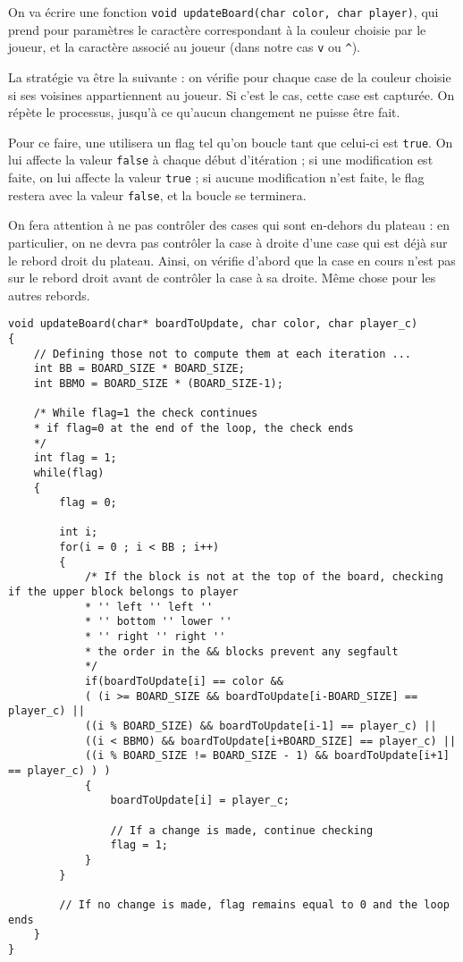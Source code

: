 \documentclass[a4paper,11pt]{article}
\begin{document}
	On va écrire une fonction \texttt{void updateBoard(char color, char player)}, qui prend pour paramètres le caractère correspondant à la couleur choisie par le joueur, et la caractère associé au joueur (dans notre cas \texttt{v} ou \texttt{\^}).
	
	La stratégie va être la suivante : on vérifie pour chaque case de la couleur choisie si ses voisines appartiennent au joueur. Si c'est le cas, cette case est capturée. On répète le processus, jusqu'à ce qu'aucun changement ne puisse être fait.
	
	Pour ce faire, une utilisera un flag tel qu'on boucle tant que celui-ci est \texttt{true}. On lui affecte la valeur \texttt{false} à chaque début d'itération ; si une modification est faite, on lui affecte la valeur \texttt{true} ; si aucune modification n'est faite, le flag restera avec la valeur \texttt{false}, et la boucle se terminera.
	
	On fera attention \`a ne pas contr\^oler des cases qui sont en-dehors du plateau : en particulier, on ne devra pas contr\^oler la case \`a droite d'une case qui est d\'ej\`a sur le rebord droit du plateau. Ainsi, on v\'erifie d'abord que la case en cours n'est pas sur le rebord droit avant de contr\^oler la case \`a sa droite. M\^eme chose pour les autres rebords.
	
	\begin{lstlisting}
void updateBoard(char* boardToUpdate, char color, char player_c)
{
	// Defining those not to compute them at each iteration ...
	int BB = BOARD_SIZE * BOARD_SIZE;
	int BBMO = BOARD_SIZE * (BOARD_SIZE-1);
	
	/* While flag=1 the check continues
	* if flag=0 at the end of the loop, the check ends
	*/
	int flag = 1;
	while(flag)
	{
		flag = 0;
		
		int i;
		for(i = 0 ; i < BB ; i++)
		{
			/* If the block is not at the top of the board, checking if the upper block belongs to player
			* '' left '' left ''
			* '' bottom '' lower ''
			* '' right '' right ''
			* the order in the && blocks prevent any segfault
			*/
			if(boardToUpdate[i] == color &&
			( (i >= BOARD_SIZE && boardToUpdate[i-BOARD_SIZE] == player_c) ||
			((i % BOARD_SIZE) && boardToUpdate[i-1] == player_c) ||
			((i < BBMO) && boardToUpdate[i+BOARD_SIZE] == player_c) ||
			((i % BOARD_SIZE != BOARD_SIZE - 1) && boardToUpdate[i+1] == player_c) ) )
			{
				boardToUpdate[i] = player_c;
				
				// If a change is made, continue checking
				flag = 1;
			}
		}
		
		// If no change is made, flag remains equal to 0 and the loop ends
	}
}\end{lstlisting}
	
\end{document}
